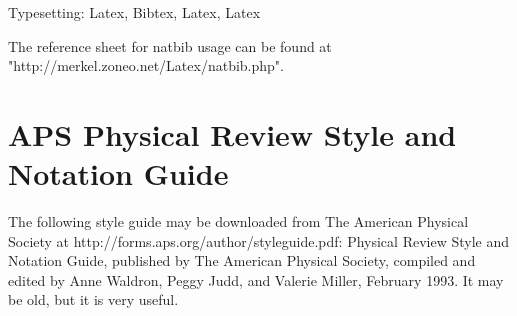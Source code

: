 Typesetting:   Latex, Bibtex, Latex, Latex

The reference sheet for natbib usage can be found at \newline "http://merkel.zoneo.net/Latex/natbib.php".

\section{APS Physical Review Style and Notation Guide}

The following style guide may be downloaded from The American Physical Society at http://forms.aps.org/author/styleguide.pdf:  Physical Review Style and Notation Guide, published by The American Physical Society, compiled and edited by Anne Waldron, Peggy Judd, and Valerie Miller, February 1993.  It may be old, but it is very useful.

